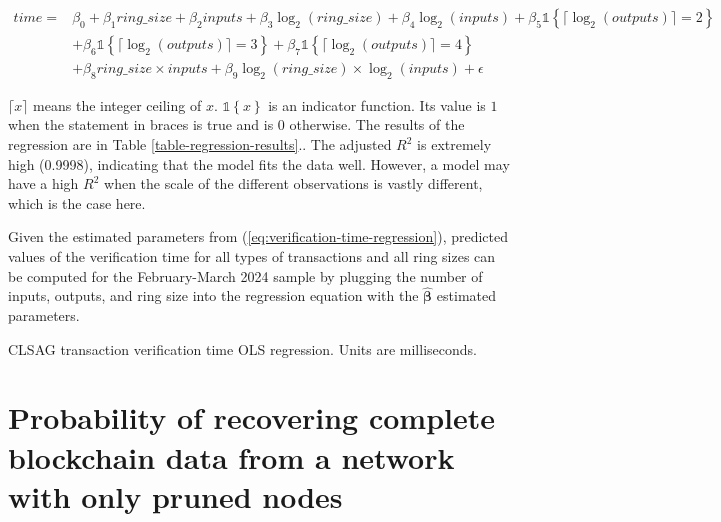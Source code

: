 \documentclass[english]{article}
\begin{document}
\begin{equation}
\begin{array}{cl}
time= & \beta_{0}+\beta_{1}ring\_size+\beta_{2}inputs+\beta_{3}\log_{2}(ring\_size)+\beta_{4}\log_{2}(inputs)+\beta_{5}\mathbb{{1}}\left\{ \lceil\log_{2}(outputs)\rceil=2\right\} \\
 & +\beta_{6}\mathbb{{1}}\left\{ \lceil\log_{2}(outputs)\rceil=3\right\} +\beta_{7}\mathbb{{1}}\left\{ \lceil\log_{2}(outputs)\rceil=4\right\} \\
 & +\beta_{8}ring\_size\times inputs+\beta_{9}\log_{2}(ring\_size)\times\log_{2}(inputs)+\epsilon
\end{array}\label{eq:verification-time-regression}
\end{equation}

$\lceil x\rceil$ means the integer ceiling of $x$. $\mathbb{{1}}\left\{ x\right\} $
is an indicator function. Its value is $1$ when the statement in
braces is true and is $0$ otherwise. The results of the regression
are in Table \ref{table-regression-results}.. The adjusted $R^{2}$
is extremely high (0.9998), indicating that the model fits the data
well. However, a model may have a high $R^{2}$ when the scale of
the different observations is vastly different, which is the case
here.

Given the estimated parameters from (\ref{eq:verification-time-regression}),
predicted values of the verification time for all types of transactions
and all ring sizes can be computed for the February-March 2024 sample
by plugging the number of inputs, outputs, and ring size into the
regression equation with the $\hat{\boldsymbol{\beta}}$ estimated
parameters.

\begin{table}[H]
\caption{CLSAG transaction verification time OLS regression. Units are milliseconds.}



\label{table-regression-results}
\end{table}

\newpage{}

\section{Probability of recovering complete blockchain data from a network
with only pruned nodes\label{sec:Probability-of-recovering-complete-blockchain-data}}
\end{document}

